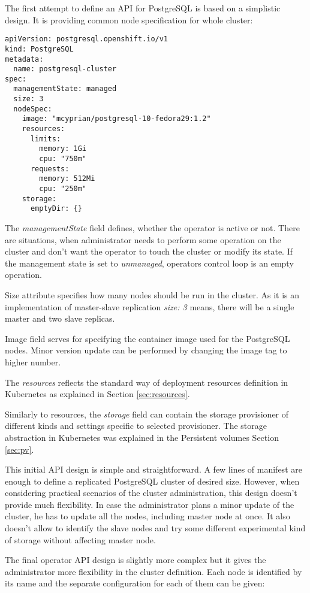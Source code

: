 \documentclass[
  digital, %
  twoside, %
  table,   %
  lof,     %
  lot,     %
]{fithesis3}
\begin{document}
The first attempt to define an API for PostgreSQL is based on a simplistic design. It is providing common node specification for whole cluster:

\begin{lstlisting}
apiVersion: postgresql.openshift.io/v1
kind: PostgreSQL
metadata:
  name: postgresql-cluster
spec:
  managementState: managed
  size: 3
  nodeSpec:
    image: "mcyprian/postgresql-10-fedora29:1.2"
    resources:
      limits:
        memory: 1Gi
        cpu: "750m"
      requests:
        memory: 512Mi
        cpu: "250m"
    storage:
      emptyDir: {}
\end{lstlisting}

The \textit{managementState} field defines, whether the operator is active or not. There are situations, when administrator needs to perform some operation on the cluster and don't want the operator to touch the cluster or modify its state. If the management state is set to \textit{unmanaged}, operators control loop is an empty operation.

Size attribute specifies how many nodes should be run in the cluster. As it is an implementation of master-slave replication \textit{size: 3} means, there will be a single master and two slave replicas.

Image field serves for specifying the container image used for the PostgreSQL nodes. Minor version update can be performed by changing the image tag to higher number.

The \textit{resources} reflects the standard way of deployment resources definition in Kubernetes as explained in Section \ref{sec:resources}.

Similarly to resources, the \textit{storage} field can contain the storage provisioner of different kinds and settings specific to selected provisioner. The storage abstraction in Kubernetes was explained in the Persistent volumes Section \ref{sec:pv}.

This initial API design is simple and straightforward. A few lines of manifest are enough to define a replicated PostgreSQL cluster of desired size. However, when considering practical scenarios of the cluster administration, this design doesn't provide much flexibility. In case the administrator plans a minor update of the cluster, he has to update all the nodes, including master node at once. It also doesn't allow to identify the slave nodes and try some different experimental kind of storage without affecting master node.

The final operator API design is slightly more complex but it gives the administrator more flexibility in the cluster definition. Each node is identified by its name and the separate configuration for each of them can be given:
\end{document}
